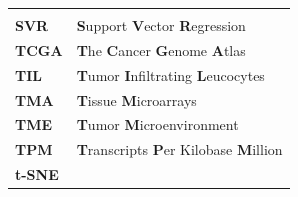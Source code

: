 \documentclass[12pt,]{book}
\theoremstyle{definition}
\theoremstyle{definition}
\theoremstyle{definition}
\theoremstyle{remark}
\begin{document}
\begin{longtable}[]{@{}ll@{}}
\begin{minipage}[t]{0.81\columnwidth}
\end{minipage}\tabularnewline
\begin{minipage}[t]{0.13\columnwidth}\raggedright
\textbf{SVR}\strut
\end{minipage} & \begin{minipage}[t]{0.81\columnwidth}\raggedright
\textbf{S}upport \textbf{V}ector \textbf{R}egression\strut
\end{minipage}\tabularnewline
\begin{minipage}[t]{0.13\columnwidth}\raggedright
\textbf{TCGA}\strut
\end{minipage} & \begin{minipage}[t]{0.81\columnwidth}\raggedright
\textbf{T}he \textbf{C}ancer \textbf{G}enome \textbf{A}tlas\strut
\end{minipage}\tabularnewline
\begin{minipage}[t]{0.13\columnwidth}\raggedright
\textbf{TIL}\strut
\end{minipage} & \begin{minipage}[t]{0.81\columnwidth}\raggedright
\textbf{T}umor \textbf{I}nfiltrating \textbf{L}eucocytes\strut
\end{minipage}\tabularnewline
\begin{minipage}[t]{0.13\columnwidth}\raggedright
\textbf{TMA}\strut
\end{minipage} & \begin{minipage}[t]{0.81\columnwidth}\raggedright
\textbf{T}issue \textbf{M}icroarrays\strut
\end{minipage}\tabularnewline
\begin{minipage}[t]{0.13\columnwidth}\raggedright
\textbf{TME }\strut
\end{minipage} & \begin{minipage}[t]{0.81\columnwidth}\raggedright
\textbf{T}umor \textbf{M}icroenvironment\strut
\end{minipage}\tabularnewline
\begin{minipage}[t]{0.13\columnwidth}\raggedright
\textbf{TPM}\strut
\end{minipage} & \begin{minipage}[t]{0.81\columnwidth}\raggedright
\textbf{T}ranscripts \textbf{P}er Kilobase \textbf{M}illion\strut
\end{minipage}\tabularnewline
\begin{minipage}[t]{0.13\columnwidth}\raggedright
\textbf{t-SNE}\strut
\end{minipage} & \begin{minipage}[t]{0.81\columnwidth}\raggedright

\end{minipage}
\end{longtable}
\end{document}
